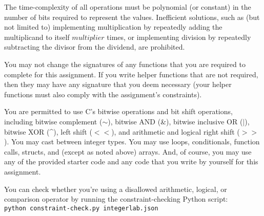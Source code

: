 The time-complexity of all operations must be polynomial (or constant) in the number of bits required to represent the values.
Inefficient solutions, such as (but not limited to) implementing multiplication by repeatedly adding the multiplicand to itself $multiplier$ times, or implementing division by repeatedly subtracting the divisor from the dividend, are prohibited.

You may not change the signatures of any functions that you are required to complete for this assignment.
If you write helper functions that are not required, then they may have any signature that you deem necessary
(your helper functions must also comply with the assignment's constraints).

You are permitted to use C's bitwise operations and bit shift operations, including bitwise complement ($\sim$), bitwise AND (\&), bitwise inclusive OR ($|$), bitwise XOR (\^{}), left shift ($<<$), and arithmetic and logical right shift ($>>$).
You may cast between integer types.
You may use loops, conditionals, function calls, structs, and (except as noted above) arrays.
And, of course, you may use any of the provided starter code and any code that you write by yourself for this assignment.

You can check whether you're using a disallowed arithmetic, logical, or comparison operator by running the constraint-checking Python script: \\
\texttt{python constraint-check.py integerlab.json}


